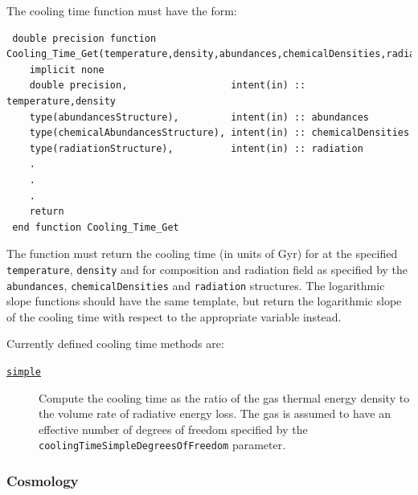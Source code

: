 The cooling time function must have the form:
\begin{verbatim}
 double precision function Cooling_Time_Get(temperature,density,abundances,chemicalDensities,radiation)
    implicit none
    double precision,                  intent(in) :: temperature,density
    type(abundancesStructure),         intent(in) :: abundances
    type(chemicalAbundancesStructure), intent(in) :: chemicalDensities
    type(radiationStructure),          intent(in) :: radiation
    .
    .
    .
    return
 end function Cooling_Time_Get
\end{verbatim}
The function must return the cooling time (in units of Gyr) for at the specified {\tt temperature}, {\tt density} and for composition and radiation field as specified by the {\tt abundances}, {\tt chemicalDensities} and {\tt radiation} structures. The logarithmic slope functions should have the same template, but return the logarithmic slope of the cooling time with respect to the appropriate variable instead.

Currently defined cooling time methods are:
\begin{description}
 \item [\hyperlink{cooling.cooling_time.simple.F90:cooling_times_simple:cooling_time_simple}{{\tt simple}}] Compute the cooling time as the ratio of the gas thermal energy density to the volume rate of radiative energy loss. The gas is assumed to have an effective number of degrees of freedom specified by the {\tt coolingTimeSimpleDegreesOfFreedom} parameter.
\end{description}

\subsubsection{Cosmology}\label{sec:CosmologyMethods}

